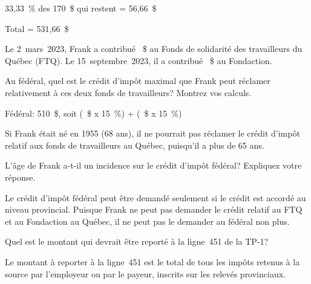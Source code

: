 33,33~\% des 170~\$ qui restent = 56,66~\$

Total = 531,66~\$

\begin{question}
	Le 2~mars~2023, Frank a contribué ~\$ au Fonds de solidarité des travailleurs du Québec (FTQ). Le 15~septembre~2023, il a contribué
	~\$ au Fondaction.
	
	Au fédéral, quel est le crédit d'impôt maximal que Frank peut réclamer relativement à ces deux fonds de travailleurs? Montrez vos calculs.
\end{question}
Fédéral: 510~\$, soit (~\$ x 15~\%) + (~\$ x 15~\%)

\begin{question}
	Si Frank était né en 1955 (68 ans), il ne pourrait pas réclamer le crédit d'impôt relatif aux fonds de travailleurs au Québec, puisqu'il a plus de 65 ans. 
	
	L'âge de Frank a-t-il un incidence sur le crédit d'impôt fédéral? Expliquez votre réponse.
\end{question}
Le crédit d'impôt fédéral peut être demandé seulement si le crédit est accordé au niveau provincial. Puisque Frank ne peut pas demander le crédit relatif au FTQ et au Fondaction au Québec, il ne peut pas le demander au fédéral non plus.

\begin{question}
	Quel est le montant qui devrait être reporté à la ligne~451 de la TP-1?
\end{question}
Le montant à reporter à la ligne~451 est le total de tous les impôts retenus à la source par l'employeur ou par le payeur, inscrits sur les relevés provinciaux.

